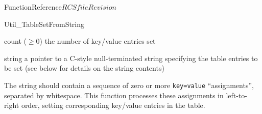 \begin{cactuspart}{FunctionReference}{$RCSfile$}{$Revision$}
\begin{FunctionDescription}{Util\_TableSetFromString}
\begin{ResultSection}
\begin{Result}{count ($\ge 0$)}
the number of key/value entries set
\end{Result}
\end{ResultSection}

\begin{ParameterSection}
\begin{Parameter}{string}
a pointer to a C-style null-terminated string specifying the table
entries to be set (see below for details on the string contents)
\end{Parameter}
\end{ParameterSection}

\begin{Discussion}
The string should contain a sequence of zero or more \verb|key=value|
``assignments'', separated by whitespace.  This function processes
these assignments in left-to-right order, setting corresponding key/value
entries in the table.


\end{Discussion}
\end{FunctionDescription}
\end{cactuspart}
